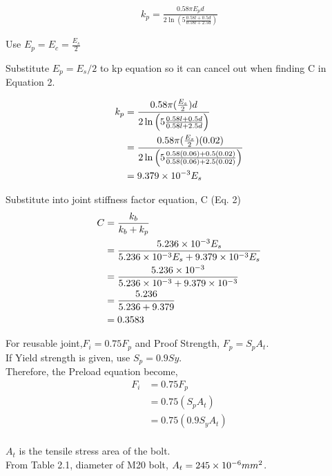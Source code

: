 \documentclass[a4paper, fleqn]{article}
\providecommand{\sci}[1]{\protect\ensuremath{\times 10^{\StrSubstitute[0]{#1}{e}{}}}}
\begin{document}
\begin{equation}
    \begin{aligned}
    k_p=\frac{0.58\pi E_p d}{2\ln\left( 5\frac{0.58l+0.5d}{0.58l+2.5d} \right)}
    \end{aligned}
\end{equation}

Use $E_p=E_c=\frac{E_s}{2}$

Substitute $E_p=E_s/2$ to kp equation so it can cancel out when finding C in Equation 2.

\begin{equation*}
    \begin{aligned}
        k_p&=\frac{0.58\pi (\frac{E_s}{2}) d}{2\ln\left( 5\frac{0.58l+0.5d}{0.58l+2.5d} \right)}\\
        &=\frac{0.58\pi (\frac{E_s}{2}) (0.02)}{2\ln\left( 5\frac{0.58(0.06)+0.5(0.02)}{0.58(0.06)+2.5(0.02)} \right)}\\
        &= 9.379\sci{e-3}E_s
    \end{aligned}
\end{equation*}


Substitute into joint stiffness factor equation, C (Eq. 2)
\begin{equation*}
    \begin{aligned}
    C&=\frac{k_b}{k_b+k_p} \\
    &=\frac{5.236\sci{e-3}E_s}{5.236\sci{e-3}E_s+9.379\sci{e-3}E_s} \\
    &=\frac{5.236\sci{e-3}}{5.236\sci{e-3}+9.379\sci{e-3}} \\
    &=\frac{5.236}{5.236+9.379} \\
    &=0.3583
    \end{aligned}
\end{equation*}

For reusable joint,$F_i=0.75F_p$ and Proof Strength, $F_p=S_pA_t$.\\
If Yield strength is given, use $S_p=0.9Sy$. \\
Therefore, the Preload equation become,
\begin{equation*}
    \begin{aligned}
        F_i&=0.75F_p\\
        &=0.75(S_pA_t)\\
        &=0.75(0.9S_yA_t)\\
    \end{aligned}
\end{equation*}

$A_t$ is the tensile stress area of the bolt.\\
From Table 2.1, diameter of M20 bolt, $A_t=245\sci{e-6}mm^2$.
\end{document}
